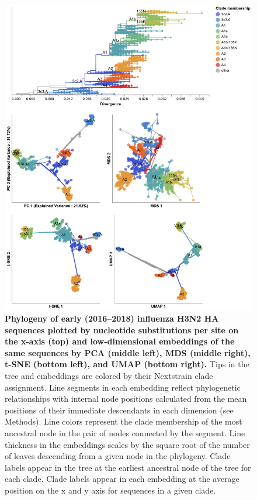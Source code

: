\documentclass[webpdf,contemporary,large,single]{oup-authoring-template}%
\theoremstyle{thmstyleone}%
\theoremstyle{thmstyletwo}%
\theoremstyle{thmstylethree}%
\begin{document}
\begin{figure}[!h]
\includegraphics[width=0.9\columnwidth]{figures/flu-2016-2018-ha-embeddings-by-clade.png}
\caption{{\bf Phylogeny of early (2016--2018) influenza H3N2 HA sequences plotted by nucleotide substitutions per site on the x-axis (top) and low-dimensional embeddings of the same sequences by PCA (middle left), MDS (middle right), t-SNE (bottom left), and UMAP (bottom right).}
  Tips in the tree and embeddings are colored by their Nextstrain clade assignment.
  Line segments in each embedding reflect phylogenetic relationships with internal node positions calculated from the mean positions of their immediate descendants in each dimension (see Methods).
  Line colors represent the clade membership of the most ancestral node in the pair of nodes connected by the segment.
  Line thickness in the embeddings scales by the square root of the number of leaves descending from a given node in the phylogeny.
  Clade labels appear in the tree at the earliest ancestral node of the tree for each clade.
  Clade labels appear in each embedding at the average position on the x and y axis for sequences in a given clade.
}
\label{fig:seasonal-influenza-h3n2-ha-embeddings}
\end{figure}
\end{document}
